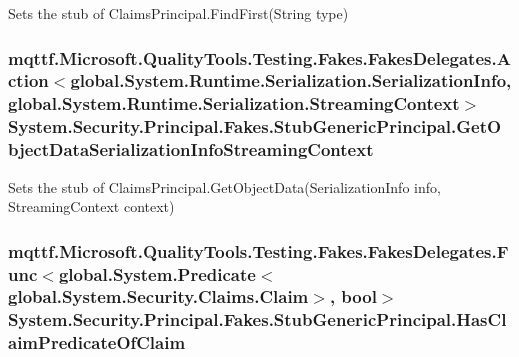 Sets the stub of Claims\-Principal.\-Find\-First(\-String type)

\hypertarget{class_system_1_1_security_1_1_principal_1_1_fakes_1_1_stub_generic_principal_a6319897ace309bca5103ef69acaf3a8c}{
\subsubsection[{Get\-Object\-Data\-Serialization\-Info\-Streaming\-Context}]{\setlength{\rightskip}{0pt plus 5cm}mqttf.\-Microsoft.\-Quality\-Tools.\-Testing.\-Fakes.\-Fakes\-Delegates.\-Action$<$global.\-System.\-Runtime.\-Serialization.\-Serialization\-Info, global.\-System.\-Runtime.\-Serialization.\-Streaming\-Context$>$ System.\-Security.\-Principal.\-Fakes.\-Stub\-Generic\-Principal.\-Get\-Object\-Data\-Serialization\-Info\-Streaming\-Context}}\label{class_system_1_1_security_1_1_principal_1_1_fakes_1_1_stub_generic_principal_a6319897ace309bca5103ef69acaf3a8c}


Sets the stub of Claims\-Principal.\-Get\-Object\-Data(\-Serialization\-Info info, Streaming\-Context context)

\hypertarget{class_system_1_1_security_1_1_principal_1_1_fakes_1_1_stub_generic_principal_a54badf57ba4834742ab3719dc5580ded}{
\subsubsection[{Has\-Claim\-Predicate\-Of\-Claim}]{\setlength{\rightskip}{0pt plus 5cm}mqttf.\-Microsoft.\-Quality\-Tools.\-Testing.\-Fakes.\-Fakes\-Delegates.\-Func$<$global.\-System.\-Predicate$<$global.\-System.\-Security.\-Claims.\-Claim$>$, bool$>$ System.\-Security.\-Principal.\-Fakes.\-Stub\-Generic\-Principal.\-Has\-Claim\-Predicate\-Of\-Claim}}\label{class_system_1_1_security_1_1_principal_1_1_fakes_1_1_stub_generic_principal_a54badf57ba4834742ab3719dc5580ded}


